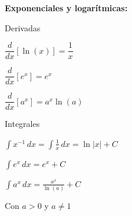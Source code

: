 \textbf{Exponenciales y logar\'itmicas:}
\begin{table}[h]
\begin{tcolorbox}[boxrule=0.2pt, enhanced,sharp corners,   width=13cm,colframe=blue!8!black,colback=blue!5!white,drop lifted shadow=blue ]
\begin{footnotesize}
\begin{multicols}{2}
\begin{list}{}{} 
\item Derivadas
\item $\dfrac{d}{dx}[\ln (x)] =\dfrac{1}{x}$
\item $\dfrac{d}{dx}[e^{x}]=e^{x}$
\item $\dfrac{d}{dx}[a^{x}] = a^{x}\ln(a)$
\columnbreak
\item Integrales
\item $\displaystyle \int x^{-1}\,dx=\int \frac{1}{x}\,dx=\ln |x|+C$
\item $\displaystyle \int e^{x}\,dx=e^{x}+C$
\item $\displaystyle \int a^{x}\,dx=\frac{a^{x}}{\ln(a)}+C$
\end{list}
\end{multicols}
Con  $a>0$ y $a\neq 1$
\end{footnotesize}
\end{tcolorbox}
\end{table}


%

